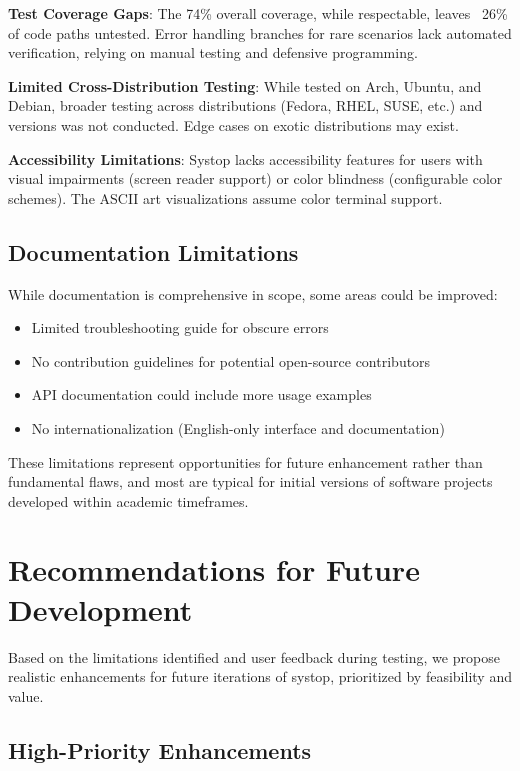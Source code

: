 \documentclass[12pt,a4paper,oneside]{report}
\begin{document}
\textbf{Test Coverage Gaps}: The 74\% overall coverage, while respectable, leaves ~26\% of code paths untested. Error handling branches for rare scenarios lack automated verification, relying on manual testing and defensive programming.

\textbf{Limited Cross-Distribution Testing}: While tested on Arch, Ubuntu, and Debian, broader testing across distributions (Fedora, RHEL, SUSE, etc.) and versions was not conducted. Edge cases on exotic distributions may exist.

\textbf{Accessibility Limitations}: Systop lacks accessibility features for users with visual impairments (screen reader support) or color blindness (configurable color schemes). The ASCII art visualizations assume color terminal support.

\subsection{Documentation Limitations}

While documentation is comprehensive in scope, some areas could be improved:
\begin{itemize}
    \item Limited troubleshooting guide for obscure errors
    \item No contribution guidelines for potential open-source contributors
    \item API documentation could include more usage examples
    \item No internationalization (English-only interface and documentation)
\end{itemize}

These limitations represent opportunities for future enhancement rather than fundamental flaws, and most are typical for initial versions of software projects developed within academic timeframes.

\section{Recommendations for Future Development}
\label{sec:recommendations}

Based on the limitations identified and user feedback during testing, we propose realistic enhancements for future iterations of systop, prioritized by feasibility and value.

\subsection{High-Priority Enhancements}
\end{document}
